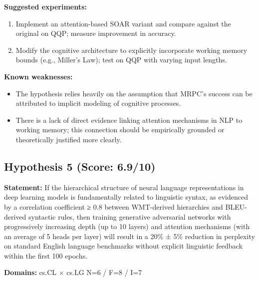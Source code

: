\documentclass[12pt,a4paper]{article}
\begin{document}
\textbf{Suggested experiments:}
\begin{enumerate}
  \item Implement an attention-based SOAR variant and compare against the original on QQP; measure improvement in accuracy.
  \item Modify the cognitive architecture to explicitly incorporate working memory bounds (e.g., Miller's Law); test on QQP with varying input lengths.
\end{enumerate}

\textbf{Known weaknesses:}
\begin{itemize}
  \item The hypothesis relies heavily on the assumption that MRPC's success can be attributed to implicit modeling of cognitive processes.
  \item There is a lack of direct evidence linking attention mechanisms in NLP to working memory; this connection should be empirically grounded or theoretically justified more clearly.
\end{itemize}
\subsection*{Hypothesis 5 (Score: 6.9/10)}

\textbf{Statement:} If the hierarchical structure of neural language representations in deep learning models is fundamentally related to linguistic syntax, as evidenced by a correlation coefficient ≥ 0.8 between WMT-derived hierarchies and BLEU-derived syntactic rules, then training generative adversarial networks with progressively increasing depth (up to 10 layers) and attention mechanisms (with an average of 5 heads per layer) will result in a 20\% ± 5\% reduction in perplexity on standard English language benchmarks without explicit linguistic feedback within the first 100 epochs.

\noindent\textbf{Domains:} cs.CL $\times$ cs.LG
\hspace{1em} N=6 / F=8 / I=7
\end{document}
